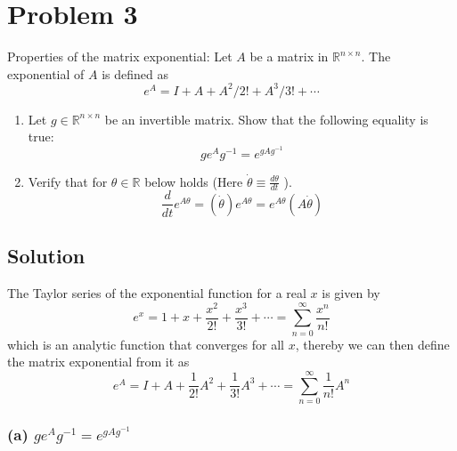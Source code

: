 \section*{Problem 3}

Properties of the matrix exponential:
Let \( A \) be a matrix in \( \mathbb{R}^{n \times n} \).
The exponential of \( A \) is defined as
\begin{equation*}
    e^{A}=I+A+A^{2} / 2!+A^{3} / 3!+\cdots
\end{equation*}
\begin{enumerate}[label= (\alph*)]
    \item Let \( g \in \mathbb{R}^{n \times n} \) be an invertible matrix. Show that the following equality is true:
          \begin{equation*}
              g e^{A} g^{-1}=e^{g A g^{-1}}
          \end{equation*}

    \item Verify that for \( \theta \in \mathbb{R} \) below holds (Here \( \dot{\theta} \equiv \frac{d \theta}{d t} \) ).
          \begin{equation*}
              \frac{d}{d t} e^{A \theta}=(\dot{\theta}) e^{A \theta}=e^{A \theta}(A \dot{\theta})
          \end{equation*}
\end{enumerate}

\subsection*{Solution}

The Taylor series of the exponential function for a real \( x \) is given by
\begin{equation*}
    e^{x}
    =
    1+x+\frac{x^{2}}{2 !}+\frac{x^{3}}{3 !}+\cdots
    =
    \sum_{n=0}^{\infty} \frac{x^{n}}{n !}
\end{equation*}
which is an analytic function that converges for all \( x \), thereby we can then define the matrix exponential from it as
\begin{equation*}
    e^{A}
    =
    I+A+\frac{1}{2 !}A^{2}+\frac{1}{3 !}A^{3}+\cdots
    =
    \sum_{n=0}^{\infty} \frac{1}{n !}A^{n}
\end{equation*}

\subsubsection*{(a) \( g e^{A} g^{-1}=e^{g A g^{-1}} \)}

